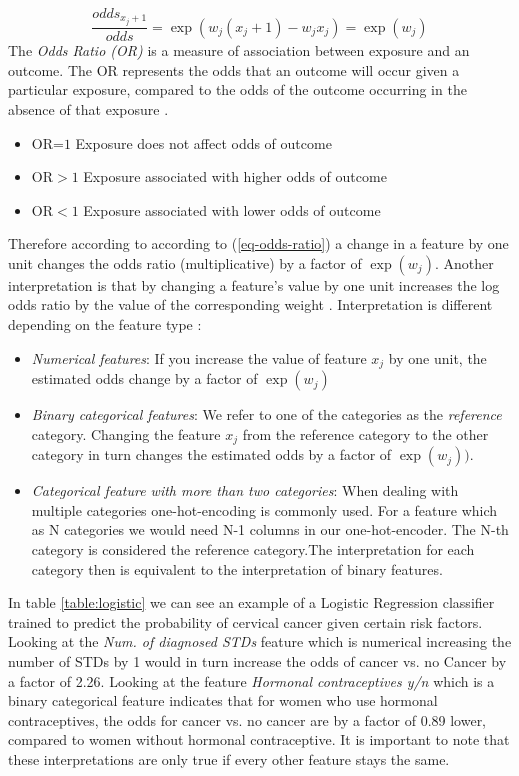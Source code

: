 \begin{equation}
    \frac{odds_{x_{j}+1}}{odds} = \exp(w_{j}(x_{j} + 1) - w_{j}x_{j}) = \exp(w_{j})
    \label{eq-odds-ratio}
\end{equation}
The \emph{Odds Ratio (OR)} is a measure of association between exposure and an outcome. The OR represents the odds that an outcome will occur given a particular exposure, compared to the odds of the outcome occurring in the absence of that exposure \cite {Szumilas2010ExplainingRatios}.
\begin{itemize}
    \item OR=$1$ Exposure does not affect odds of outcome
    \item OR$>1$ Exposure associated with higher odds of outcome
    \item OR$<1$ Exposure associated with lower odds of outcome
\end{itemize}
Therefore according to according to (\ref{eq-odds-ratio}) a change in a feature by one unit changes the odds ratio (multiplicative) by a factor of $\exp(w_{j})$. Another interpretation is that by changing a feature's value by one unit increases the log odds ratio by the value of the corresponding weight \cite{molnar2019}. Interpretation is different depending on the feature type \cite{molnar2019}:
\begin{itemize}
    \item \emph{Numerical features}: If you increase the value of feature $x_{j}$ by one unit, the estimated odds change by a factor of $\exp(w_{j})$
    \item \emph{Binary categorical features}: We refer to one of the categories as the \emph{reference} category. Changing the feature $x_{j}$ from the reference category to the other category in turn changes the estimated odds by a factor of $\exp(w_{j}))$.
    \item \emph{Categorical feature with more than two categories}:  When dealing with multiple categories one-hot-encoding is commonly used. For a feature which as N categories we would need N-1 columns in our one-hot-encoder. The N-th category is  considered the reference category.The interpretation for each category then is equivalent to the interpretation of binary features.
\end{itemize}
In table \ref{table:logistic} we can see an example of a Logistic Regression classifier trained to predict the probability of cervical cancer given certain risk factors. Looking at the \emph{Num. of diagnosed STDs} feature which is numerical increasing the number of STDs by 1 would in turn increase the odds of cancer vs. no Cancer by a factor of 2.26. Looking at the feature \emph{Hormonal contraceptives y/n} which is a binary categorical feature indicates that for women who use hormonal contraceptives, the odds for cancer vs. no cancer are by a factor of 0.89 lower, compared to women without hormonal contraceptive. It is important to note that these interpretations are only true if every other feature stays the same.
